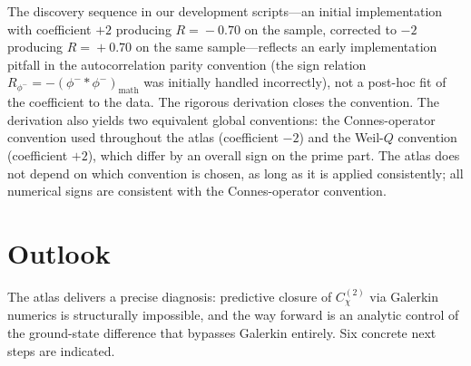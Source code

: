 \documentclass[10pt,twocolumn]{article}
\theoremstyle{definition}
\theoremstyle{remark}
\newcommand{\chifn}{\chi}
\begin{document}
The discovery sequence in our development scripts---an initial
implementation with coefficient $+2$ producing $R\!=\!-0.70$ on the
sample, corrected to $-2$ producing $R\!=\!+0.70$ on the same
sample---reflects an early implementation pitfall in the
autocorrelation parity convention (the sign relation
$R_{\phi^-}=-(\phi^-{*}\phi^-)_{\mathrm{math}}$ was initially handled
incorrectly), not a post-hoc fit of the coefficient to the data. The
rigorous derivation closes the convention. The derivation also yields
two equivalent global conventions: the Connes-operator convention
used throughout the atlas (coefficient $-2$) and the Weil-$Q$
convention (coefficient $+2$), which differ by an overall sign on
the prime part. The atlas does not depend on which convention is
chosen, as long as it is applied consistently; all numerical signs
are consistent with the Connes-operator convention.

\section{Outlook}
\label{sec:outlook}

The atlas delivers a precise diagnosis: predictive closure of
$C^{(2)}_{\chifn}$ via Galerkin numerics is structurally
impossible, and the way forward is an analytic control of the
ground-state difference that bypasses Galerkin entirely. Six
concrete next steps are indicated.
\end{document}
